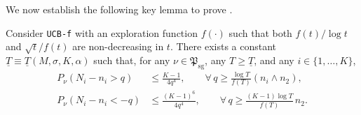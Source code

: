 \documentclass[nonblindrev]{informs3_noinforms}
\begin{document}
We now establish the following key lemma to prove .
{
\begin{lemma}\label{lem:N_i_tail_bound}
Consider \texttt{UCB-f} with an exploration function $f(\cdot)$ such that both
$f(t)/\log t$ and $\sqrt{t}/f(t)$ are non-decreasing in $t$. There exists a constant
$\underline{T}\equiv \underline{T}(M,\sigma,K,\alpha)$ such that, for any
$\nu\in\mathfrak{P}_{\mathrm{sg}}$, any $T\ge \underline{T}$, and any $i\in\{1,\dots,K\}$,
\begin{align*}
P_{\nu}\!\left(N_i-n_i>q\right)
&\le \frac{K-1}{4q^4},
\qquad \forall\, q\ge \frac{\log T}{f(T)}\left(n_i\wedge n_2\right),\\
P_{\nu}\!\left(N_i-n_i<-q\right)
&\le \frac{(K-1)^6}{4q^4},
\qquad \forall\, q\ge \frac{(K-1)\log T}{f(T)}\,n_2.
\end{align*}
\end{lemma}
}
\end{document}
